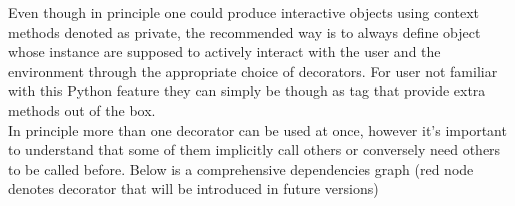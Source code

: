 
Even though in principle one could produce interactive objects using context methods denoted as private, the recommended way is to always define object whose instance are supposed to actively interact with the user and the environment through the appropriate choice of decorators. For user not familiar with this Python feature they can simply be though as tag that provide extra methods out of the box.\\
In principle more than one decorator can be used at once, however it's important to understand that some of them implicitly call others or conversely need others to be called before. Below is a comprehensive dependencies graph (red node denotes decorator that will be introduced in future versions)

\begin{center}
\end{center}